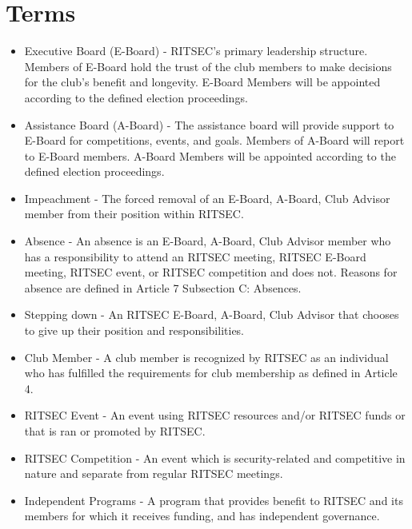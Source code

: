 
\part{Terms}

\begin{itemize}
  \item Executive Board (E-Board) - RITSEC’s primary leadership structure.
    Members of E-Board hold the trust of the club members to make decisions for
    the club's benefit and longevity. E-Board Members will be appointed
    according to the defined election proceedings.
  \item Assistance Board (A-Board) - The assistance board will provide support
    to E-Board for competitions, events, and goals. Members of A-Board will
    report to E-Board members. A-Board Members will be appointed according to
    the defined election proceedings.
  \item Impeachment - The forced removal of an E-Board, A-Board, Club Advisor
    member from their position within RITSEC.
  \item Absence - An absence is an E-Board, A-Board, Club Advisor member who
    has a responsibility to attend an RITSEC meeting, RITSEC E-Board meeting,
    RITSEC event, or RITSEC competition and does not. Reasons for absence are
    defined in Article 7 Subsection C: Absences.
  \item Stepping down - An RITSEC E-Board, A-Board, Club Advisor that chooses
    to give up their position and responsibilities.
  \item Club Member - A club member is recognized by RITSEC as an individual
    who has fulfilled the requirements for club membership as defined in
    Article 4.
  \item RITSEC Event - An event using RITSEC resources and/or RITSEC funds or
    that is ran or promoted by RITSEC.
  \item RITSEC Competition - An event which is security-related and competitive
    in nature and separate from regular RITSEC meetings.
  \item Independent Programs - A program that provides benefit to RITSEC and
    its members for which it receives funding, and has independent governance.
\end{itemize}